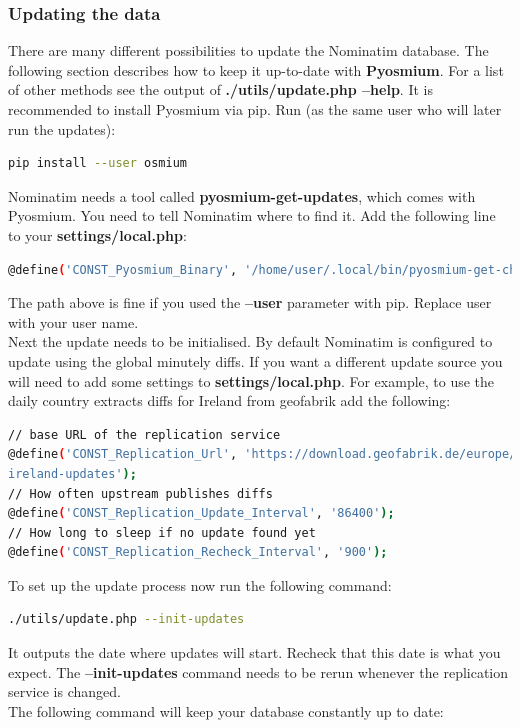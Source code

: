 \documentclass[12pt]{article}
\begin{document}
\subsubsection{Updating the data}
There are many different possibilities to update the Nominatim database. The following section
describes how to keep it up-to-date with \textbf{Pyosmium}. For a list of other methods see the output of
\textbf{./utils/update.php --help}. It is recommended to install Pyosmium via pip. Run (as the same user who will later run the updates):
\begin{lstlisting}[language=bash,breaklines=true]
pip install --user osmium
\end{lstlisting}
Nominatim needs a tool called \textbf{pyosmium-get-updates}, which comes with Pyosmium. You need
to tell Nominatim where to find it. Add the following line to your \textbf{settings/local.php}:
\begin{lstlisting}[language=bash,breaklines=true]
@define('CONST_Pyosmium_Binary', '/home/user/.local/bin/pyosmium-get-changes');
\end{lstlisting}
The path above is fine if you used the \textbf{--user} parameter with pip. Replace user with your user
name. \\
Next the update needs to be initialised. By default Nominatim is configured to update using the
global minutely diffs. If you want a different update source you will need to add some settings to \textbf{settings/local.php}.
For example, to use the daily country extracts diffs for Ireland from geofabrik add the following:
\begin{lstlisting}[language=bash,breaklines=true]
// base URL of the replication service
@define('CONST_Replication_Url', 'https://download.geofabrik.de/europe/ireland-and-northern-
ireland-updates');
// How often upstream publishes diffs
@define('CONST_Replication_Update_Interval', '86400');
// How long to sleep if no update found yet
@define('CONST_Replication_Recheck_Interval', '900');
\end{lstlisting}
To set up the update process now run the following command:
\begin{lstlisting}[language=bash,breaklines=true]
./utils/update.php --init-updates
\end{lstlisting}
It outputs the date where updates will start. Recheck that this date is what you expect.
The \textbf{--init-updates} command needs to be rerun whenever the replication service is changed.\\
The following command will keep your database constantly up to date:
\end{document}
